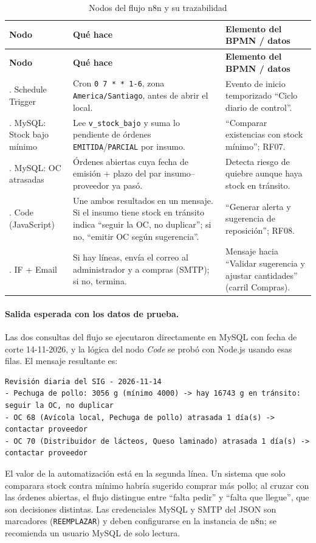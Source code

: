\documentclass[11pt,letterpaper]{article}
\newcommand{\tablasize}{\footnotesize}
\begin{document}
{\tablasize
\begin{longtable}{>{\raggedright\arraybackslash}p{2.9cm}>{\raggedright\arraybackslash}p{6.6cm}>{\raggedright\arraybackslash}p{5.1cm}}
\caption{Nodos del flujo n8n y su trazabilidad}\label{tab:n8n}\\
\toprule \textbf{Nodo} & \textbf{Qué hace} & \textbf{Elemento del BPMN / datos} \\ \midrule \endfirsthead
\toprule \textbf{Nodo} & \textbf{Qué hace} & \textbf{Elemento del BPMN / datos} \\ \midrule \endhead
1. Schedule Trigger & Cron \texttt{0 7 * * 1-6}, zona \texttt{America/Santiago}, antes de abrir el local. & Evento de inicio temporizado ``Ciclo diario de control''. \\
2. MySQL: Stock bajo mínimo & Lee \texttt{v\_stock\_bajo} y suma lo pendiente de órdenes \texttt{EMITIDA}/\texttt{PARCIAL} por insumo. & ``Comparar existencias con stock mínimo''; RF07. \\
3. MySQL: OC atrasadas & Órdenes abiertas cuya fecha de emisión + plazo del par insumo--proveedor ya pasó. & Detecta riesgo de quiebre aunque haya stock en tránsito. \\
4. Code (JavaScript) & Une ambos resultados en un mensaje. Si el insumo tiene stock en tránsito indica ``seguir la OC, no duplicar''; si no, ``emitir OC según sugerencia''. & ``Generar alerta y sugerencia de reposición''; RF08. \\
5. IF + Email & Si hay líneas, envía el correo al administrador y a compras (SMTP); si no, termina. & Mensaje hacia ``Validar sugerencia y ajustar cantidades'' (carril Compras). \\
\bottomrule
\end{longtable}
}

\paragraph{Salida esperada con los datos de prueba.} Las dos consultas del flujo se ejecutaron directamente en MySQL con fecha de corte 14-11-2026, y la lógica del nodo \emph{Code} se probó con Node.js usando esas filas. El mensaje resultante es:
\begin{lstlisting}[language={},basicstyle=\ttfamily\scriptsize]
Revisión diaria del SIG - 2026-11-14
- Pechuga de pollo: 3056 g (mínimo 4000) -> hay 16743 g en tránsito: seguir la OC, no duplicar
- OC 68 (Avícola local, Pechuga de pollo) atrasada 1 día(s) -> contactar proveedor
- OC 70 (Distribuidor de lácteos, Queso laminado) atrasada 1 día(s) -> contactar proveedor
\end{lstlisting}
El valor de la automatización está en la segunda línea. Un sistema que solo comparara stock contra mínimo habría sugerido comprar más pollo; al cruzar con las órdenes abiertas, el flujo distingue entre ``falta pedir'' y ``falta que llegue'', que son decisiones distintas. Las credenciales MySQL y SMTP del JSON son marcadores (\texttt{REEMPLAZAR}) y deben configurarse en la instancia de n8n; se recomienda un usuario MySQL de solo lectura.
\end{document}
